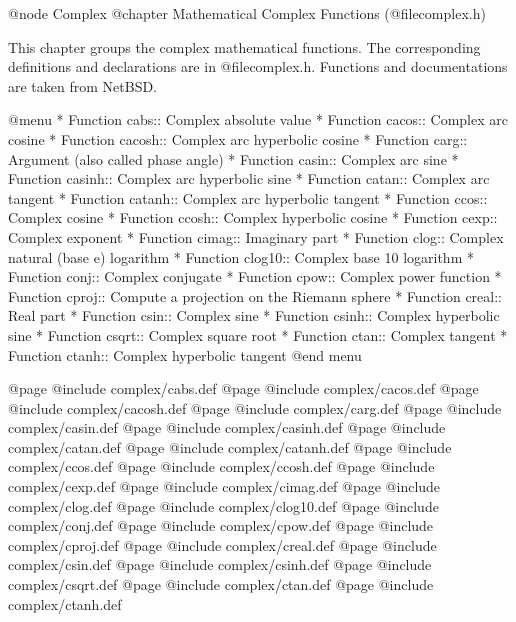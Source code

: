 @node Complex
@chapter Mathematical Complex Functions (@file{complex.h})

This chapter groups the complex mathematical functions.  The
corresponding definitions and declarations are in @file{complex.h}.
Functions and documentations are taken from NetBSD.

@menu
* Function cabs::	Complex absolute value
* Function cacos::	Complex arc cosine
* Function cacosh::	Complex arc hyperbolic cosine
* Function carg::	Argument (also called phase angle)
* Function casin::	Complex arc sine
* Function casinh::	Complex arc hyperbolic sine
* Function catan::	Complex arc tangent
* Function catanh::	Complex arc hyperbolic tangent
* Function ccos::	Complex cosine
* Function ccosh::	Complex hyperbolic cosine
* Function cexp::	Complex exponent
* Function cimag::	Imaginary part
* Function clog::	Complex natural (base e) logarithm
* Function clog10::	Complex base 10 logarithm
* Function conj::	Complex conjugate
* Function cpow::	Complex power function
* Function cproj::	Compute a projection on the Riemann sphere
* Function creal::	Real part
* Function csin::	Complex sine
* Function csinh::	Complex hyperbolic sine
* Function csqrt::	Complex square root
* Function ctan::	Complex tangent
* Function ctanh::	Complex hyperbolic tangent
@end menu

@page
@include   complex/cabs.def
@page
@include   complex/cacos.def
@page
@include   complex/cacosh.def
@page
@include   complex/carg.def
@page
@include   complex/casin.def
@page
@include   complex/casinh.def
@page
@include   complex/catan.def
@page
@include   complex/catanh.def
@page
@include   complex/ccos.def
@page
@include   complex/ccosh.def
@page
@include   complex/cexp.def
@page
@include   complex/cimag.def
@page
@include   complex/clog.def
@page
@include   complex/clog10.def
@page
@include   complex/conj.def
@page
@include   complex/cpow.def
@page
@include   complex/cproj.def
@page
@include   complex/creal.def
@page
@include   complex/csin.def
@page
@include   complex/csinh.def
@page
@include   complex/csqrt.def
@page
@include   complex/ctan.def
@page
@include   complex/ctanh.def
